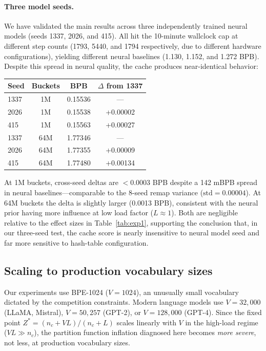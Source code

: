 \documentclass[11pt]{article}
\begin{document}
\paragraph{Three model seeds.} We have validated the main results across three independently trained neural models (seeds 1337, 2026, and 415). All hit the 10-minute wallclock cap at different step counts (1793, 5440, and 1794 respectively, due to different hardware configurations), yielding different neural baselines (1.130, 1.152, and 1.272 BPB). Despite this spread in neural quality, the cache produces near-identical behavior:

\begin{center}
\small
\begin{tabular}{lccc}
\toprule
Seed & Buckets & BPB & $\Delta$ from 1337 \\
\midrule
1337 & 1M & 0.15536 & --- \\
2026 & 1M & 0.15538 & +0.00002 \\
415 & 1M & 0.15563 & +0.00027 \\
\midrule
1337 & 64M & 1.77346 & --- \\
2026 & 64M & 1.77355 & +0.00009 \\
415 & 64M & 1.77480 & +0.00134 \\
\bottomrule
\end{tabular}
\end{center}

\noindent At 1M buckets, cross-seed deltas are $<$0.0003 BPB despite a 142 mBPB spread in neural baselines---comparable to the 8-seed remap variance ($\text{std} = 0.00004$). At 64M buckets the delta is slightly larger (0.0013 BPB), consistent with the neural prior having more influence at low load factor ($L \approx 1$). Both are negligible relative to the effect sizes in Table~\ref{tab:exp1}, supporting the conclusion that, in our three-seed test, the cache score is nearly insensitive to neural model seed and far more sensitive to hash-table configuration.

\subsection{Scaling to production vocabulary sizes}
\label{sec:scaling}

Our experiments use BPE-1024 ($V = 1024$), an unusually small vocabulary dictated by the competition constraints. Modern language models use $V = 32{,}000$ (LLaMA, Mistral), $V = 50{,}257$ (GPT-2), or $V = 128{,}000$ (GPT-4). Since the fixed point $Z^* = (n_c + VL)/(n_c + L)$ scales linearly with $V$ in the high-load regime ($VL \gg n_c$), the partition function inflation diagnosed here becomes \emph{more severe}, not less, at production vocabulary sizes.
\end{document}

